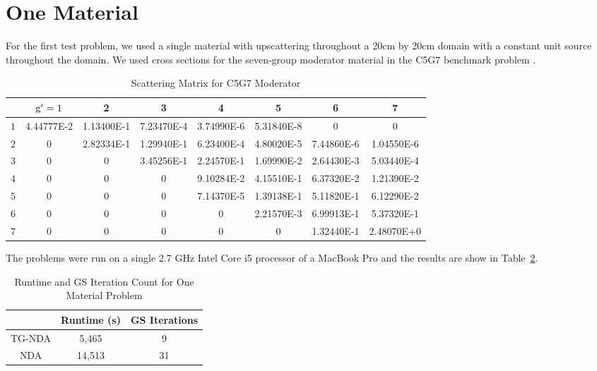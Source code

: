 \section{One Material}
For the first test problem, we used a single material with upscattering throughout a 20cm by 20cm domain with a constant unit source throughout the domain. 
 We used cross sections for the seven-group moderator material in the C5G7 benchmark problem \cite{C5G7}.  
 \begin{table}[!htb]
\small
\centering
\caption{Scattering Matrix for C5G7 Moderator}
    \label{tab:two}
\begin{center}
    \begin{tabular}{|c|c|c|c|c|c|c|c|}
\hline
 & $\mathrm{g}'=1$ & 2 & 3 & 4 & 5 & 6 & 7 \\ 
\hline
 $1$ & 4.44777E-2 &  1.13400E-1 & 7.23470E-4 & 3.74990E-6 & 5.31840E-8     &  0     &    0  \\
\hline
 $2$  & 0       &    2.82334E-1 & 1.29940E-1 & 6.23400E-4  & 4.80020E-5  & 7.44860E-6 &  1.04550E-6 \\
\hline
 $3$  & 0        &      0  &     3.45256E-1 & 2.24570E-1 & 1.69990E-2 & 2.64430E-3 & 5.03440E-4 \\
\hline
 $4$  & 0          &     0    &       0     &  9.10284E-2 & 4.15510E-1 & 6.37320E-2 & 1.21390E-2 \\
\hline
 $5$  & 0        &       0     &      0     & 7.14370E-5 & 1.39138E-1 & 5.11820E-1 & 6.12290E-2 \\
\hline
$6$  & 0        &       0   &    0      &  0     &  2.21570E-3 & 6.99913E-1 &  5.37320E-1 \\
\hline
$7$  & 0       &        0        &   0      &     0      &     0   &    1.32440E-1 & 2.48070E+0 \\
\hline
    \end{tabular}
\end{center}
\end{table}

The problems were run on a single 2.7 GHz Intel Core i5 processor of a MacBook Pro and the results are show in Table~\ref{tab:onemat}.
\begin{table}[!htb]
\centering
\caption{Runtime and GS Iteration Count for One Material Problem}
    \label{tab:onemat}
\begin{center}
    \begin{tabular}{|c|c|c|}
    \hline
    & Runtime (s) & GS Iterations \\
    \hline

    TG-NDA & 5,465 & 9 \\
    NDA & 14,513 & 31 \\
    \hline
    \end{tabular}
\end{center}
\end{table}

